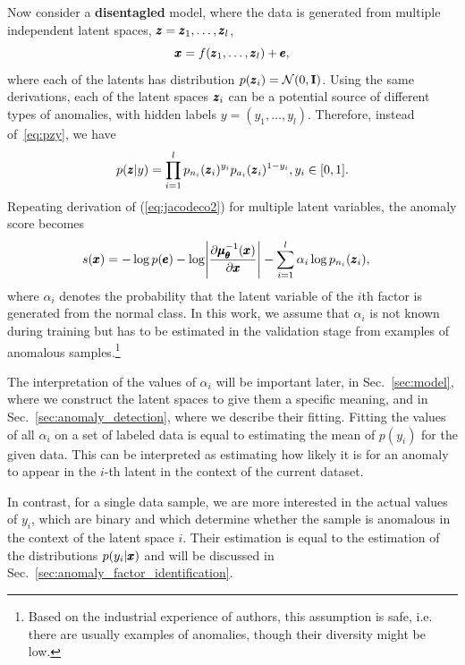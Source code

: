 Now consider a \textbf{disentagled} model, where the data is generated from multiple independent latent spaces, $\pmb{{z}}=\pmb{{z}}_{1},\ldots,\pmb{{z}}_{l}$, 
\begin{equation} \label{eq:multilatent}
\pmb{{x}}=f(\pmb{{z}}_{1},\ldots,\pmb{{z}}_{l})+\pmb{{e}},
\end{equation}
where each of the latents has distribution $p(\pmb{{z}}_{i})=\mathcal{N}(0,\mathbf{I})$. Using the same derivations, each of the latent spaces $\pmb{{z}}_i$ can be a potential source of different types of anomalies, with hidden labels  $y=(y_{1},\ldots,y_{l})   $. Therefore, instead of~\eqref{eq:pzy},  we have
\begin{equation} 
p(\pmb{{z}}\vert y)= \prod_{i=1}^l p_{n_i}(\pmb{{z}}_i)^{y_i}p_{a_i}(\pmb{{z}}_i)^{1-y_i},y_i\in[0,1].
\end{equation}
Repeating derivation of (\ref{eq:jacodeco2}) for multiple latent variables, the anomaly score becomes
\begin{align} \label{eq:alphadeco}
s(\vc{x}) & = - \log p(\vc{e}) - \log\left\vert \frac{\partial \vc{\mu}_{\vc{\theta}}^{-1}(\vc{x})}{\partial \vc{x}}\right\vert  -  \sum_{i=1}^{l}\alpha_{i}\log p_{n_{i}}(\vc{z}_{i}),
\end{align}
where $\alpha_{i}$ denotes the probability that the latent variable of the $i$th factor is generated from the normal class. In this work, we assume that $\alpha_i$ is not known during training but has to be estimated in the validation stage from examples of anomalous samples.\footnote{Based on the  industrial experience of authors, this assumption is safe, i.e. there are usually examples of anomalies, though their diversity might be low.}

The interpretation of the values of $\alpha_i$ will be important later, in Sec.~\ref{sec:model}, where we construct the latent spaces to give them a specific meaning, and in Sec.~\ref{sec:anomaly_detection}, where we describe their fitting. Fitting the values of all $\alpha_i$ on a set of labeled data is equal to estimating the mean of $p(y_i)$ for the given data. This can be interpreted as estimating how likely it is for an anomaly to appear in the $i$-th latent in the context of the current dataset. 

In contrast, for a single data sample, we are more interested in the actual values of $y_i$, which are binary and which determine whether the sample is anomalous in the context of the latent space $i$. Their estimation is equal to the estimation of the distributions $p(y_i \vert \pmb{{x}})$ and will be discussed in Sec.~\ref{sec:anomaly_factor_identification}. 

